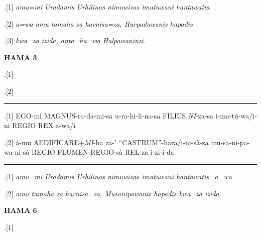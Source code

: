\begin{flushleft}
\ex.[1] \emph{amu=mi Uradamis Urhilinas nimuwizas imatuwani hantawatis}.

\ex.[2] \emph{a=wa amu tamaha za harnisa=za, Hurpadawanis hapadis}

\ex.[3] \emph{kwa=za izida, anta=ha=wa Halpawaninzi.}


\noindent \textbf{HAMA 3}

\ex.[1] \large {}\hspace{5pt}
\hspace{5pt}
\hspace{5pt}
\hspace{5pt}
\hspace{5pt}
\hspace{5pt}
\hspace{5pt}

\ex.[2] \large 
{}\hspace{5pt}
\hspace{5pt}
\hspace{5pt}
\hspace{5pt}
\hspace{5pt}
\hspace{5pt}
\hspace{5pt}


\hrule

	\ex.[1]  {EGO-mi}
{MAGNUS-ra-da-mi-sa}
{u-ra-hi-li-na-sa}
{FILIUS.\emph{NI}-za-sa}
{i-ma-tú-wa/i-ni}
{REGIO}
{REX}
{a-wa/i}

\ex.[2]   {á-mu} {AEDIFICARE+\emph{MI}-ha} {za-'} {``CASTRUM''-hara/i-ni-sà-za}
{mu-sa-ni-pa-wa-ni-sà REGIO}
{FLUMEN-REGIO-sà}
{REL-za i-zi-i-da}


\hrule

\ex.[1] \emph{amu=mi Uradamis Urhilinas nimuwizas imatuwani hantawatis.\ a=wa}

\ex.[2] \emph{amu tamaha za harnisa=za, Musanipawanis hapadis kwa=za izida}

\sloppybottom
\clearpage

\noindent \textbf{HAMA 6}

	\ex.[1] \large {}\hspace{5pt}
\hspace{5pt}
\hspace{5pt}
\hspace{5pt}
\hspace{5pt}
\hspace{5pt}
\hspace{5pt}


\end{flushleft}

